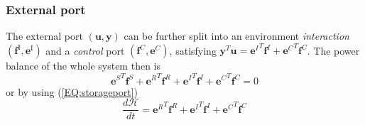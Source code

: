 \documentclass[a4paper,twoside, openright,12pt]{report}
\newcommand{\f}[1]{\boldsymbol{#1}}
\begin{document}
{\subsubsection{External port}
The external port $(\f{u},\f{y})$ can be further split into an environment \emph{interaction} $(\f{f}^\text{I},\f{e}^\text{I})$ and a \emph{control} port $(\f{f}^C,\f{e}^C)$, satisfying $\f{y}^T \f{u} = {\f{e}^I}^T \f{f}^I + {\f{e}^C}^T \f{f}^C$.
The power balance of the whole system then is
\begin{equation}
{\f{e}^S}^T \f{f}^S + {\f{e}^R}^T \f{f}^R +{\f{e}^I}^T \f{f}^I + {\f{e}^C}^T \f{f}^C = 0
\end{equation} 
or by using (\ref{EQ:storageport})
\begin{equation}\label{EQ:energybalance}
\frac{d\mathcal{H}}{dt} = {\f{e}^R}^T \f{f}^R + {\f{e}^I}^T\f{f}^I + {\f{e}^C}^T \f{f}^C 
\end{equation}

}
\end{document}
